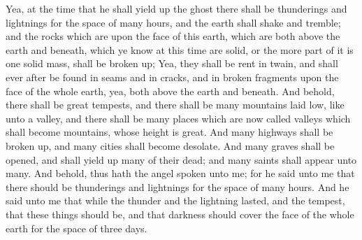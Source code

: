 Yea, at the time that he shall yield up the ghost there shall be thunderings and lightnings for the space of many hours, and the earth shall shake and tremble; and the rocks which are upon the face of this earth, which are both above the earth and beneath, which ye know at this time are solid, or the more part of it is one solid mass, shall be broken up;
\bverse \iffalse Yea, they shall be rent in twain, and shall ever after be found in seams and in cracks, and in broken fragments upon the face of the whole earth, yea, both above the earth and beneath. \fi
Yea, they shall be rent in twain, and shall ever after be found in seams and in cracks, and in broken fragments upon the face of the whole earth, yea, both above the earth and beneath.
\bverse \iffalse And behold, there shall be great tempests, and there shall be many mountains laid low, like unto a valley, and there shall be many places which are now called valleys which shall become mountains, whose height is great. \fi
And behold, there shall be great tempests, and there shall be many mountains laid low, like unto a valley, and there shall be many places which are now called valleys which shall become mountains, whose height is great.
\bverse \iffalse And many highways shall be broken up, and many cities shall become desolate. \fi
And many highways shall be broken up, and many cities shall become desolate.
\bverse \iffalse And many graves shall be opened, and shall yield up many of their dead; and many saints shall appear unto many. \fi
And many graves shall be opened, and shall yield up many of their dead; and many saints shall appear unto many.
\bverse \iffalse And behold, thus hath the angel spoken unto me; for he said unto me that there should be thunderings and lightnings for the space of many hours. \fi
And behold, thus hath the angel spoken unto me; for he said unto me that there should be thunderings and lightnings for the space of many hours.
\bverse \iffalse And he said unto me that while the thunder and the lightning lasted, and the tempest, that these things should be, and that darkness should cover the face of the whole earth for the space of three days. \fi
And he said unto me that while the thunder and the lightning lasted, and the tempest, that these things should be, and that darkness should cover the face of the whole earth for the space of three days.
\bverse \iffalse And the angel said unto me that many shall see greater things than these, to the intent that they might believe that these signs and these wonders should come to pass upon all the face of this land, to the intent that there should be no cause for unbelief among the children of men-- \fi
